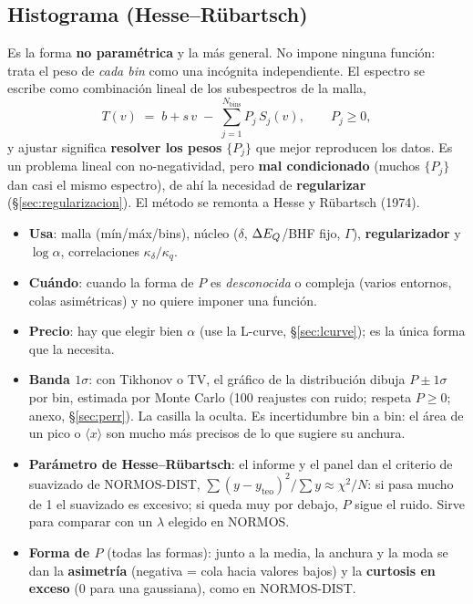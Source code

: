 \subsection{Histograma (Hesse--Rübartsch)}
\label{sec:forma-histograma}

Es la forma \textbf{no paramétrica} y la más general. No impone ninguna función:
trata el peso de \emph{cada bin} como una incógnita independiente. El espectro se
escribe como combinación lineal de los subespectros de la malla,
\[
  T(v) \;=\; b + s\,v \;-\; \sum_{j=1}^{N_{\text{bins}}} P_j\, S_j(v),
  \qquad P_j \ge 0,
\]
y ajustar significa \textbf{resolver los pesos} $\{P_j\}$ que mejor reproducen los
datos. Es un problema lineal con no-negatividad, pero \textbf{mal condicionado}
(muchos $\{P_j\}$ dan casi el mismo espectro), de ahí la necesidad de
\textbf{regularizar} (§\ref{sec:regularizacion}). El método se remonta a Hesse y
Rübartsch (1974).

\begin{itemize}[nosep]
  \item \textbf{Usa}: malla (mín/máx/bins), núcleo ($\delta$, $\Delta E_{Q}$/BHF fijo,
        $\Gamma$), \textbf{regularizador} y $\log\alpha$, correlaciones
        $\kappa_\delta/\kappa_q$.
  \item \textbf{Cuándo}: cuando la forma de $P$ es \emph{desconocida} o compleja
        (varios entornos, colas asimétricas) y no quiere imponer una función.
  \item \textbf{Precio}: hay que elegir bien $\alpha$ (use la L-curve,
        §\ref{sec:lcurve}); es la única forma que la necesita.
  \item \textbf{Banda $1\sigma$}: con Tikhonov o TV, el gráfico de la
        distribución dibuja $P\pm1\sigma$ por bin, estimada por Monte Carlo
        (100 reajustes con ruido; respeta $P\ge0$; anexo,
        §\ref{sec:perr}). La casilla  la oculta.
        Es incertidumbre bin a bin: el área de un pico o $\langle x\rangle$
        son mucho más precisos de lo que sugiere su anchura.
  \item \textbf{Parámetro de Hesse--Rübartsch}: el informe y el panel dan el
        criterio de suavizado de NORMOS-DIST,
        $\sum(y-y_\mathrm{teo})^2/\sum y \approx \chi^2/N$: si pasa mucho de 1
        el suavizado es excesivo; si queda muy por debajo, $P$ sigue el ruido.
        Sirve para comparar con un $\lambda$ elegido en NORMOS.
  \item \textbf{Forma de $P$} (todas las formas): junto a la media, la anchura
        y la moda se dan la \textbf{asimetría} (negativa = cola hacia valores
        bajos) y la \textbf{curtosis en exceso} (0 para una gaussiana), como
        en NORMOS-DIST.
\end{itemize}

